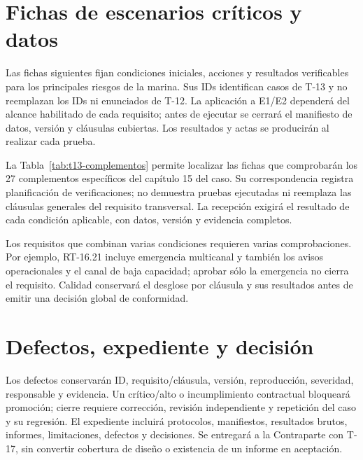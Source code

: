 \section{Fichas de escenarios críticos y datos}
Las fichas siguientes fijan condiciones iniciales, acciones y resultados verificables para los principales riesgos de la marina. Sus IDs identifican casos de T-13 y no reemplazan los IDs ni enunciados de T-12. La aplicación a E1/E2 dependerá del alcance habilitado de cada requisito; antes de ejecutar se cerrará el manifiesto de datos, versión y cláusulas cubiertas. Los resultados y actas se producirán al realizar cada prueba. \parencites[cap.~15, pp.~34--37]{sd9-c07}[cap.~5, RT-05.13/14, pp.~11--13; cap.~20, pp.~34--35]{sd9-bt}[sec.~9.1--9.2]{sd9-sd9}


La Tabla~\ref{tab:t13-complementos} permite localizar las fichas que comprobarán los 27 complementos específicos del capítulo 15 del caso. Su correspondencia registra planificación de verificaciones; no demuestra pruebas ejecutadas ni reemplaza las cláusulas generales del requisito transversal. La recepción exigirá el resultado de cada condición aplicable, con datos, versión y evidencia completos. \parencite[cap.~15, pp.~34--37]{sd9-c07}

Los requisitos que combinan varias condiciones requieren varias comprobaciones. Por ejemplo, RT-16.21 incluye emergencia multicanal y también los avisos operacionales y el canal de baja capacidad; aprobar sólo la emergencia no cierra el requisito. Calidad conservará el desglose por cláusula y sus resultados antes de emitir una decisión global de conformidad.

\section{Defectos, expediente y decisión}
Los defectos conservarán ID, requisito/cláusula, versión, reproducción, severidad, responsable y evidencia. Un crítico/alto o incumplimiento contractual bloqueará promoción; cierre requiere corrección, revisión independiente y repetición del caso y su regresión. El expediente incluirá protocolos, manifiestos, resultados brutos, informes, limitaciones, defectos y decisiones. Se entregará a la Contraparte con T-17, sin convertir cobertura de diseño o existencia de un informe en aceptación. \parencites[sec.~9.2.5--9.2.6]{sd9-sd9}[art.~18.2--18.4, p.~13]{sd9-ba}
